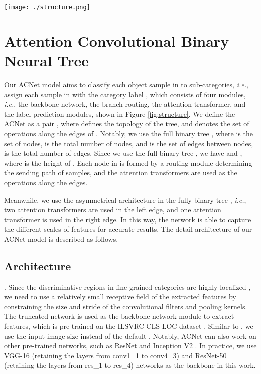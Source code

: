 \documentclass[10pt,twocolumn,letterpaper]{article}
\def\ie{{\em i.e.}}
\begin{document}
\begin{figure*}[t]
\centering
\texttt{[image: ./structure.png]}
\vspace{-4mm}
\caption{The overview of our ACNet model, formed by (a) the backbone network module, (b) the branch routing module, (c) the attention transformer module, and (d) the label prediction module. We show an example image in \textit{Fish\_Crow}. Best visualization in color.}
\label{fig:structure}
\end{figure*}

\section{Attention Convolutional Binary Neural Tree}
Our ACNet model aims to classify each object sample in  to sub-categories, \ie, assign each sample in  with the category label , which consists of four modules, \ie, the backbone network, the branch routing, the attention transformer, and the label prediction modules, shown in Figure \ref{fig:structure}. We define the ACNet as a pair , where  defines the topology of the tree, and  denotes the set of operations along the edges of . Notably, we use the full binary tree , where  is the set of nodes,  is the total number of nodes, and  is the set of edges between nodes,  is the total number of edges. Since we use the full binary tree , we have  and , where  is the height of . Each node in  is formed by a routing module determining the sending path of samples, and the attention transformers are used as the operations along the edges.

Meanwhile, we use the asymmetrical architecture in the fully binary tree , \ie, two attention transformers are used in the left edge, and one attention transformer is used in the right edge. In this way, the network is able to capture the different scales of features for accurate results. The detail architecture of our ACNet model is described as follows.

\subsection{Architecture}
{}. Since the discriminative regions in fine-grained categories are highly localized \cite{DBLP:conf/cvpr/WangMD18}, we need to use a relatively small receptive field of the extracted features by constraining the size and stride of the convolutional filters and pooling kernels. The truncated network is used as the backbone network module to extract features, which is pre-trained on the ILSVRC CLS-LOC dataset \cite{DBLP:journals/ijcv/RussakovskyDSKS15}. Similar to \cite{DBLP:conf/eccv/SunYZD18}, we use the input image size  instead of the default . Notably, ACNet can also work on other pre-trained networks, such as ResNet \cite{DBLP:conf/cvpr/HeZRS16} and Inception V2 \cite{DBLP:conf/icml/IoffeS15}. In practice, we use VGG-16 \cite{DBLP:journals/corr/SimonyanZ14a} (retaining the layers from conv1\_1 to conv4\_3) and ResNet-50 \cite{DBLP:conf/cvpr/HeZRS16} (retaining the layers from res\_1 to res\_4) networks as the backbone in this work. 
\end{document}
